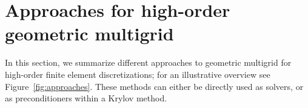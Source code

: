 \documentclass[smallcondensed,final]{svjour3}     %
\begin{document}







\section{Approaches for high-order geometric multigrid}
\label{sec:approaches}

In this section, we summarize different approaches to geometric
multigrid for high-order finite element discretizations; for an
illustrative overview see Figure~\ref{fig:approaches}. These methods
can either be directly used as solvers, or as preconditioners within a
Krylov method.
\end{document}
